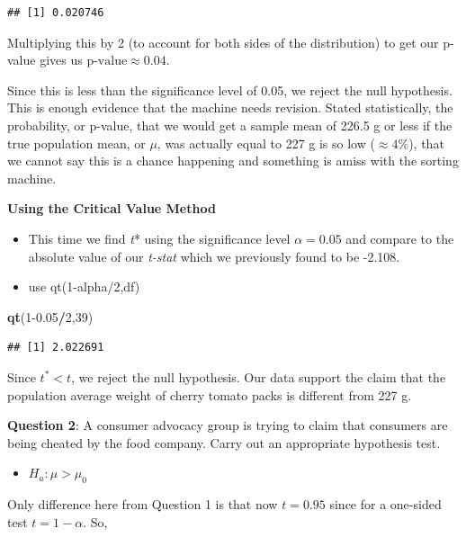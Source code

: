 \documentclass[
  openany]{book}
\newenvironment{Shaded}{\begin{snugshade}}{\end{snugshade}}
\newcommand{\DecValTok}[1]{\textcolor[rgb]{0.00,0.00,0.81}{#1}}
\newcommand{\FloatTok}[1]{\textcolor[rgb]{0.00,0.00,0.81}{#1}}
\newcommand{\FunctionTok}[1]{\textcolor[rgb]{0.13,0.29,0.53}{\textbf{#1}}}
\newcommand{\NormalTok}[1]{#1}
\newcommand{\SpecialCharTok}[1]{\textcolor[rgb]{0.81,0.36,0.00}{\textbf{#1}}}
\providecommand{\tightlist}{%
  \setlength{\itemsep}{0pt}\setlength{\parskip}{0pt}}
\begin{document}
\begin{verbatim}
## [1] 0.020746
\end{verbatim}

Multiplying this by 2 (to account for both sides of the distribution) to get our p-value gives us \(\text{p-value}\approx 0.04\).

Since this is less than the significance level of 0.05, we reject the null hypothesis. This is enough evidence that the machine needs revision. Stated statistically, the probability, or p-value, that we would get a sample mean of 226.5 g or less if the true population mean, or \(\mu\), was actually equal to 227 g is so low (\(\approx 4\%\)), that we cannot say this is a chance happening and something is amiss with the sorting machine.

\textbf{Using the Critical Value Method}

\begin{itemize}
\tightlist
\item
  This time we find \emph{t}* using the significance level \(\alpha=0.05\) and compare to the absolute value of our \emph{t-stat} which we previously found to be -2.108.
\item
  use qt(1-alpha/2,df)
\end{itemize}

\begin{Shaded}
\begin{Highlighting}[]
\FunctionTok{qt}\NormalTok{(}\DecValTok{1}\FloatTok{{-}0.05}\SpecialCharTok{/}\DecValTok{2}\NormalTok{,}\DecValTok{39}\NormalTok{)}
\end{Highlighting}
\end{Shaded}

\begin{verbatim}
## [1] 2.022691
\end{verbatim}

Since \(t^*<t\), we reject the null hypothesis. Our data support the claim that the population average weight of cherry tomato packs is different from 227 g.

\textbf{Question 2}: A consumer advocacy group is trying to claim that consumers are being cheated by the food company. Carry out an appropriate hypothesis test.

\begin{itemize}
\tightlist
\item
  \(H_a: \mu > \mu_0\)
\end{itemize}

Only difference here from Question 1 is that now \(t=0.95\) since for a one-sided test \(t=1-\alpha\). So,
\end{document}
